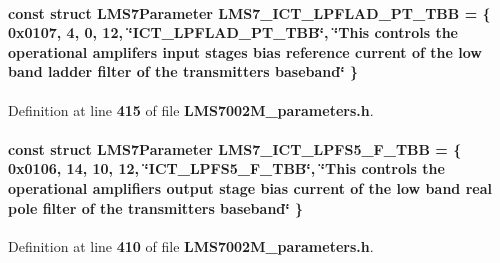 \paragraph[{L\+M\+S7\+\_\+\+I\+C\+T\+\_\+\+L\+P\+F\+L\+A\+D\+\_\+\+P\+T\+\_\+\+T\+BB}]{\setlength{\rightskip}{0pt plus 5cm}const struct {\bf L\+M\+S7\+Parameter} L\+M\+S7\+\_\+\+I\+C\+T\+\_\+\+L\+P\+F\+L\+A\+D\+\_\+\+P\+T\+\_\+\+T\+BB = \{ 0x0107, 4, 0, 12, \char`\"{}\+I\+C\+T\+\_\+\+L\+P\+F\+L\+A\+D\+\_\+\+P\+T\+\_\+\+T\+B\+B\char`\"{}, \char`\"{}\+This controls the operational amplifers\textquotesingle{} input stages bias reference current of the low band ladder filter of the transmitter\textquotesingle{}s baseband\char`\"{} \}\hspace{0.3cm}{\ttfamily [static]}}\label{LMS7002M__parameters_8h_a2ca1237dab04f2ea2f881d0e36753ae2}


Definition at line {\bf 415} of file {\bf L\+M\+S7002\+M\+\_\+parameters.\+h}.

\paragraph[{L\+M\+S7\+\_\+\+I\+C\+T\+\_\+\+L\+P\+F\+S5\+\_\+\+F\+\_\+\+T\+BB}]{\setlength{\rightskip}{0pt plus 5cm}const struct {\bf L\+M\+S7\+Parameter} L\+M\+S7\+\_\+\+I\+C\+T\+\_\+\+L\+P\+F\+S5\+\_\+\+F\+\_\+\+T\+BB = \{ 0x0106, 14, 10, 12, \char`\"{}\+I\+C\+T\+\_\+\+L\+P\+F\+S5\+\_\+\+F\+\_\+\+T\+B\+B\char`\"{}, \char`\"{}\+This controls the operational amplifier\textquotesingle{}s output stage bias current of the low band real pole filter of the transmitter\textquotesingle{}s baseband\char`\"{} \}\hspace{0.3cm}{\ttfamily [static]}}\label{LMS7002M__parameters_8h_a954b29715baac6e587cce628cadadf83}


Definition at line {\bf 410} of file {\bf L\+M\+S7002\+M\+\_\+parameters.\+h}.

